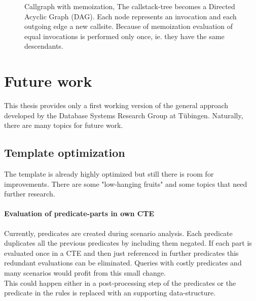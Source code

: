 

\begin{figure}
    \centering
    
    \caption{Callgraph with memoization, The callstack-tree becomes a Directed Acyclic Graph (DAG). Each node represents an invocation and each outgoing edge a new callsite. Because of memoization evaluation of equal invocations is performed only once, ie. they have the same descendants.}
    \label{fig:fib_callstack_memoization}
\end{figure}



\section{Future work}

This thesis provides only a first working version of the general approach developed by the Database Systems Research Group at Tübingen. Naturally, there are many topics for future work.

\subsection{Template optimization}
The template is already highly optimized but still there is room for improvements. There are some "low-hanging fruits" and some topics that need further research.

\paragraph*{Evaluation of predicate-parts in own CTE}
Currently, predicates are created during scenario analysis. Each predicate duplicates all the previous predicates by including them negated. If each part is evaluated once in a CTE and then just referenced in further predicates this redundant evaluations can be eliminated. Queries with costly predicates and many scenarios would profit from this small change.\\
This could happen either in a post-processing step of the predicates or the predicate in the rules is replaced with an supporting data-structure.

